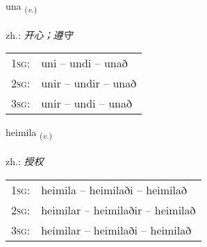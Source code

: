 \documentclass[frontgrid, backgrid]{flacards}\usepackage[]{graphicx}\usepackage[]{xcolor}
\begin{document}
\renewcommand{\flhead}{\vskip5pt \fboxsep=0pt {\small\bfseries\footnotesize Sagnorð | 动词}}
\renewcommand{\fcfoot}{\vskip5pt \fboxsep=0pt \hspace{2pt}{\small\bfseries\footnotesize 3K}}

\renewcommand{\blhead}{\vskip5pt {\small\bfseries\footnotesize Sagnorð | 动词 }}
\renewcommand{\bcfoot}{\vskip5pt \hspace{2pt}{\small\bfseries\footnotesize 3K}}


{una \small{\textsubscript{(\textit{v.})}} \\[1ex] %
\textphonetic{[ʏːna]} \\
zh.: \emph{开心；遵守} \\  [2ex]
\renewcommand*{\arraystretch}{0.8}
\begin{tabular}{p{1cm}l}
\textsc{1sg}: & uni -- undi -- unað \\ 
\textsc{2sg}: & unir -- undir -- unað \\ 
\textsc{3sg}: & unir -- undi -- unað \\ 
\end{tabular}
}

\renewcommand{\flhead}{\vskip5pt \fboxsep=0pt {\small\bfseries\footnotesize Sagnorð | 动词}}
\renewcommand{\fcfoot}{\vskip5pt \fboxsep=0pt \hspace{2pt}{\small\bfseries\footnotesize 3K}}

\renewcommand{\blhead}{\vskip5pt {\small\bfseries\footnotesize Sagnorð | 动词 }}
\renewcommand{\bcfoot}{\vskip5pt \hspace{2pt}{\small\bfseries\footnotesize 3K}}


{heimila \small{\textsubscript{(\textit{v.})}} \\[1ex] %
\textphonetic{[heiːmɪla]} \\
zh.: \emph{授权} \\  [2ex]
\renewcommand*{\arraystretch}{0.8}
\begin{tabular}{p{1cm}l}
\textsc{1sg}: & heimila -- heimilaði -- heimilað \\ 
\textsc{2sg}: & heimilar -- heimilaðir -- heimilað \\ 
\textsc{3sg}: & heimilar -- heimilaði -- heimilað \\ 
\end{tabular}
}
\end{document}
